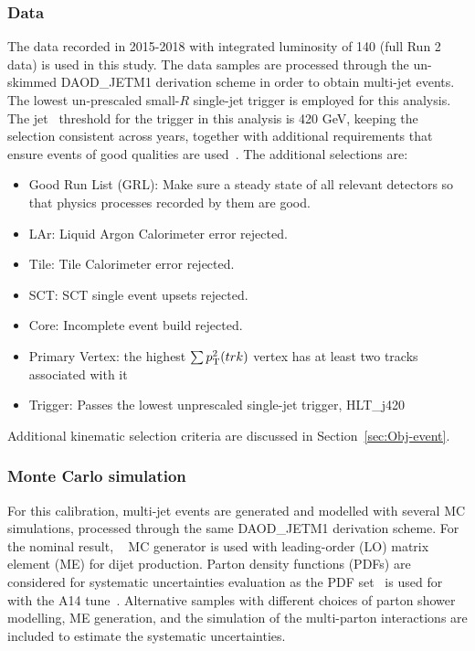 
\subsubsection{Data}
\label{subsec:data}
The data recorded in 2015-2018 with integrated luminosity of 140 \ifb (full Run 2 data)\cite{ATLAS:2022hro1} is used in this study. The data samples are processed through the un-skimmed DAOD\_JETM1 derivation scheme in order to obtain multi-jet events. The lowest un-prescaled small-$R$ single-jet trigger is employed for this analysis. The jet \pt~threshold for the trigger in this analysis is 420 GeV, keeping the selection consistent across years, together with additional requirements that ensure events of good qualities are used~\cite{ATLAS:2019fst}. The additional selections are:
\begin{itemize}
	\item Good Run List (GRL): Make sure a steady state of all relevant detectors so that physics processes recorded by them are good.
	\item LAr: Liquid Argon Calorimeter error rejected.
	\item Tile: Tile Calorimeter error rejected.
	\item SCT: SCT single event upsets rejected.
	\item Core: Incomplete event build rejected.
	\item Primary Vertex: the highest $\sum p_{\mathrm{T}}^{2}(trk)$ vertex has at least two tracks associated with it
	\item Trigger: Passes the lowest unprescaled single-jet trigger, HLT\_j420
\end{itemize}

Additional kinematic selection criteria are  discussed in Section~\ref{sec:Obj-event}.


\subsubsection{Monte Carlo simulation}
\label{subsec:MC}

For this calibration, multi-jet events are generated and modelled with several MC simulations, processed through the same DAOD\_JETM1 derivation scheme. For the nominal result, ~\cite{Sjostrand:2014zea} MC generator is used with leading-order (LO) matrix element (ME) for dijet production. Parton density functions (PDFs) are considered for systematic uncertainties evaluation as the \nnpdftwoLO PDF set~\cite{Ball:2012cx} is used for  with the A14 tune~\cite{ATL-PHYS-PUB-2014-021}.  Alternative samples with different choices of parton shower modelling, ME generation,  and the simulation of the multi-parton interactions are included to estimate the systematic uncertainties.

